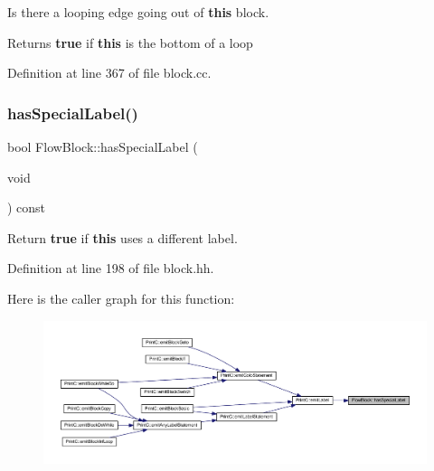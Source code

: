 Is there a looping edge going out of {\bfseries{this}} block. 

\begin{DoxyReturn}{Returns}
{\bfseries{true}} if {\bfseries{this}} is the bottom of a loop 
\end{DoxyReturn}


Definition at line 367 of file block.\+cc.

\mbox{\label{class_flow_block_a801de91f99947e442bc2b5378be21452}} 
\subsubsection{\texorpdfstring{hasSpecialLabel()}{hasSpecialLabel()}}
{\footnotesize\ttfamily bool Flow\+Block\+::has\+Special\+Label (\begin{DoxyParamCaption}\item[{void}]{ }\end{DoxyParamCaption}) const\hspace{0.3cm}{\ttfamily [inline]}}



Return {\bfseries{true}} if {\bfseries{this}} uses a different label. 



Definition at line 198 of file block.\+hh.

Here is the caller graph for this function\+:
\nopagebreak
\begin{figure}[H]
\begin{center}
\leavevmode
\includegraphics[width=350pt]{class_flow_block_a801de91f99947e442bc2b5378be21452_icgraph}
\end{center}
\end{figure}
\mbox{\label{class_flow_block_afcee72ac3b91ccd79a5360e3ff0346b9}} 
